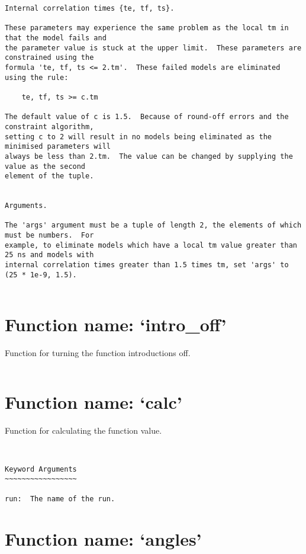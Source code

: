 \begin{verbatim}
Internal correlation times {te, tf, ts}.

These parameters may experience the same problem as the local tm in that the model fails and
the parameter value is stuck at the upper limit.  These parameters are constrained using the
formula 'te, tf, ts <= 2.tm'.  These failed models are eliminated using the rule:

    te, tf, ts >= c.tm

The default value of c is 1.5.  Because of round-off errors and the constraint algorithm,
setting c to 2 will result in no models being eliminated as the minimised parameters will
always be less than 2.tm.  The value can be changed by supplying the value as the second
element of the tuple.


Arguments.

The 'args' argument must be a tuple of length 2, the elements of which must be numbers.  For
example, to eliminate models which have a local tm value greater than 25 ns and models with
internal correlation times greater than 1.5 times tm, set 'args' to (25 * 1e-9, 1.5).


\end{verbatim}

\normalsize
\section{Function name: `intro\_off'}

Function for turning the function introductions off.
\scriptsize
\begin{verbatim}

\end{verbatim}

\normalsize
\section{Function name: `calc'}

Function for calculating the function value.
\scriptsize
\begin{verbatim}


Keyword Arguments
~~~~~~~~~~~~~~~~~

run:  The name of the run.

\end{verbatim}

\normalsize
\section{Function name: `angles'}

